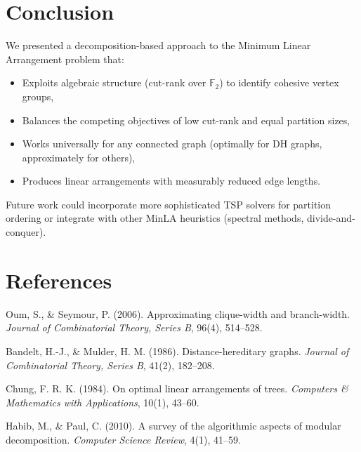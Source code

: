 \documentclass[11pt,a4paper]{article}
\theoremstyle{definition}
\theoremstyle{plain}
\theoremstyle{remark}
\newcommand{\GF}{\mathbb{F}_2}
\begin{document}
\section{Conclusion}

We presented a decomposition-based approach to the Minimum Linear Arrangement
problem that:
\begin{itemize}
  \item Exploits algebraic structure (cut-rank over $\GF$) to identify
        cohesive vertex groups,
  \item Balances the competing objectives of low cut-rank and equal partition
        sizes,
  \item Works universally for any connected graph (optimally for DH graphs,
        approximately for others),
  \item Produces linear arrangements with measurably reduced edge lengths.
\end{itemize}

Future work could incorporate more sophisticated TSP solvers for partition
ordering or integrate with other MinLA heuristics (spectral methods,
divide-and-conquer).

\section*{References}

\begin{enumerate}[label={[\arabic*]}]
  \item Oum, S., \& Seymour, P. (2006). Approximating clique-width and
        branch-width. \emph{Journal of Combinatorial Theory, Series B},
        96(4), 514--528.
  \item Bandelt, H.-J., \& Mulder, H. M. (1986). Distance-hereditary graphs.
        \emph{Journal of Combinatorial Theory, Series B}, 41(2), 182--208.
  \item Chung, F. R. K. (1984). On optimal linear arrangements of trees.
        \emph{Computers \& Mathematics with Applications}, 10(1), 43--60.
  \item Habib, M., \& Paul, C. (2010). A survey of the algorithmic aspects
        of modular decomposition. \emph{Computer Science Review}, 4(1), 41--59.
\end{enumerate}
\end{document}
